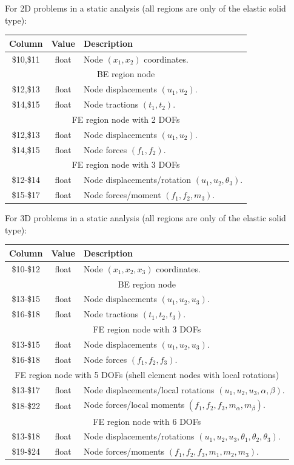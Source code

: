 \documentclass[a4paper,fleqn]{book}
\begin{document}
For 2D problems in a static analysis (all regions are only of the elastic solid type):
\begin{longtable}{ccp{11cm}}
\textbf{Column} & \textbf{Value} &\textbf{Description} \\ 
\endhead
\midrule
\$10,\$11 & float & Node $(x_1,x_2)$ coordinates. \\
\midrule
\multicolumn{3}{c}{BE region node}
\\
\$12,\$13 & float & Node displacements $(u_1,u_2)$. \\
\$14,\$15 & float & Node tractions $(t_1,t_2)$. \\
\midrule
\multicolumn{3}{c}{FE region node with 2 DOFs}
\\
\$12,\$13 & float & Node displacements $(u_1,u_2)$. \\
\$14,\$15 & float & Node forces $(f_1,f_2)$. \\
\midrule
\multicolumn{3}{c}{FE region node with 3 DOFs}
\\
\$12-\$14 & float & Node displacements/rotation $(u_1,u_2,\theta_3)$. \\
\$15-\$17 & float & Node forces/moment $(f_1,f_2,m_3)$. \\
\end{longtable}

For 3D problems in a static analysis (all regions are only of the elastic solid type):
\begin{longtable}{ccp{11cm}}
\textbf{Column} & \textbf{Value} &\textbf{Description} \\ 
\endhead
\midrule
\$10-\$12 & float & Node $(x_1,x_2,x_3)$ coordinates. \\
\midrule
\multicolumn{3}{c}{BE region node}
\\
\$13-\$15 & float & Node displacements $(u_1,u_2,u_3)$. \\
\$16-\$18 & float & Node tractions $(t_1,t_2,t_3)$. \\
\midrule
\multicolumn{3}{c}{FE region node with 3 DOFs}
\\
\$13-\$15 & float & Node displacements $(u_1,u_2,u_3)$. \\
\$16-\$18 & float & Node forces $(f_1,f_2,f_3)$. \\
\midrule
\multicolumn{3}{c}{FE region node with 5 DOFs (shell element nodes with local rotations)}
\\
\$13-\$17 & float & Node displacements/local rotations $(u_1,u_2,u_3,\alpha,\beta)$. \\
\$18-\$22 & float & Node forces/local moments $(f_1,f_2,f_3,m_\alpha,m_\beta)$. \\
\midrule
\multicolumn{3}{c}{FE region node with 6 DOFs}
\\
\$13-\$18 & float & Node displacements/rotations $(u_1,u_2,u_3,\theta_1,\theta_2,\theta_3)$. \\
\$19-\$24 & float & Node forces/moments $(f_1,f_2,f_3,m_1,m_2,m_3)$. \\
\end{longtable}
\end{document}
